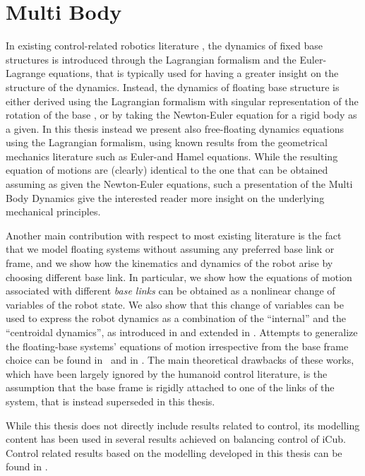 \chapter{Multi Body}
\label{chap:multibody}

In existing control-related robotics literature \citep{siciliano2010robotics}, the dynamics of fixed base structures is introduced through the Lagrangian formalism and the Euler-Lagrange equations, that is typically used for having a greater insight on the structure of the dynamics. Instead, the dynamics of floating base structure is either derived using the Lagrangian formalism with singular representation of the rotation of the base \citep{wieber2015handbook}, or by taking the Newton-Euler equation for a rigid body as a given\citep{featherstone2008,jain2010}. In this thesis instead we present also free-floating dynamics equations using the Lagrangian formalism, using known results from the geometrical mechanics literature \citep{marsden2013introduction} such as Euler-\Poincare and Hamel equations. While the resulting equation of motions are (clearly) identical to the one that can be obtained assuming as given the Newton-Euler equations, such a presentation of the Multi Body Dynamics give the interested reader more insight on the underlying mechanical principles.

Another main contribution with respect to most existing literature is the fact that we model floating systems without assuming any preferred base link or frame, and we show how the kinematics and dynamics of the robot arise by choosing  different base link. In particular, we show how the equations of motion associated with  different \emph{base links} can be obtained as a nonlinear change of variables of the robot state. We also show that this  change of variables can be  used to express the robot dynamics as a combination of the ``internal'' and the ``centroidal dynamics'', as introduced in \citep{Orin2013} and extended in \citep{garofalo2015inertially}. Attempts to generalize the floating-base systems' equations of motion irrespective from the  base frame choice can be found in~\citep[Chapter 3]{oort2011} and in \citep[Chapter 17, Section 3.6]{jain2010}. The main theoretical drawbacks of these works, which have been largely ignored by the humanoid control literature, is the assumption that the base frame is rigidly attached to one of the links of the system, that is instead superseded in this thesis.

While this thesis does not directly include results related to control, its modelling content has been used in several results achieved on balancing control of iCub.  Control related results based on the modelling developed in this thesis can be found in \citep{nava2016,pucci2016gain,dafarra2016}.

